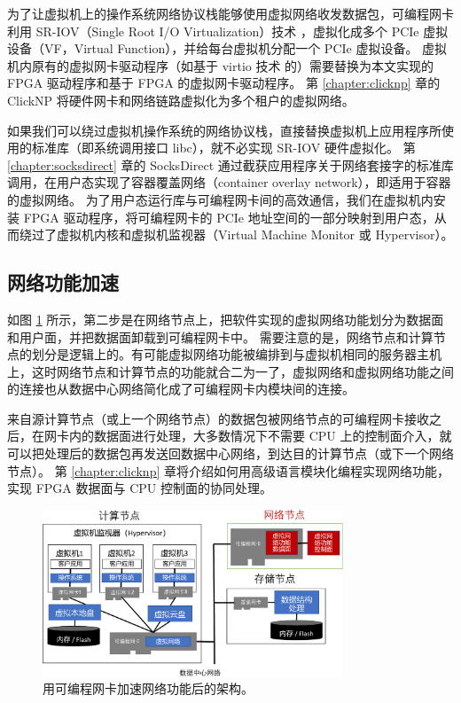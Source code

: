 为了让虚拟机上的操作系统网络协议栈能够使用虚拟网络收发数据包，可编程网卡利用 SR-IOV（Single Root I/O Virtualization）技术 \cite{dong2012high}，虚拟化成多个 PCIe 虚拟设备（VF，Virtual Function），并给每台虚拟机分配一个 PCIe 虚拟设备。
虚拟机内原有的虚拟网卡驱动程序（如基于 virtio 技术 \cite{russell2008virtio} 的）需要替换为本文实现的 FPGA 驱动程序和基于 FPGA 的虚拟网卡驱动程序。
第 \ref{chapter:clicknp} 章的 ClickNP 将硬件网卡和网络链路虚拟化为多个租户的虚拟网络。

如果我们可以绕过虚拟机操作系统的网络协议栈，直接替换虚拟机上应用程序所使用的标准库（即系统调用接口 libc），就不必实现 SR-IOV 硬件虚拟化。
第 \ref{chapter:socksdirect} 章的 SocksDirect 通过截获应用程序关于网络套接字的标准库调用，在用户态实现了容器覆盖网络（container overlay network），即适用于容器的虚拟网络。
为了用户态运行库与可编程网卡间的高效通信，我们在虚拟机内安装 FPGA 驱动程序，将可编程网卡的 PCIe 地址空间的一部分映射到用户态，从而绕过了虚拟机内核和虚拟机监视器（Virtual Machine Monitor 或 Hypervisor）。



\subsection{网络功能加速}

如图 \ref{arch:fig:network-function} 所示，第二步是在网络节点上，把软件实现的虚拟网络功能划分为数据面和用户面，并把数据面卸载到可编程网卡中。
需要注意的是，网络节点和计算节点的划分是逻辑上的。有可能虚拟网络功能被编排到与虚拟机相同的服务器主机上，这时网络节点和计算节点的功能就合二为一了，虚拟网络和虚拟网络功能之间的连接也从数据中心网络简化成了可编程网卡内模块间的连接。

来自源计算节点（或上一个网络节点）的数据包被网络节点的可编程网卡接收之后，在网卡内的数据面进行处理，大多数情况下不需要 CPU 上的控制面介入，就可以把处理后的数据包再发送回数据中心网络，到达目的计算节点（或下一个网络节点）。
第 \ref{chapter:clicknp} 章将介绍如何用高级语言模块化编程实现网络功能，实现 FPGA 数据面与 CPU 控制面的协同处理。


\begin{figure}[htbp]
	\centering
	\includegraphics[width=0.8\textwidth]{figures/NFV_accel.pdf}
	\caption{用可编程网卡加速网络功能后的架构。}
	\label{arch:fig:network-function}
\end{figure}

